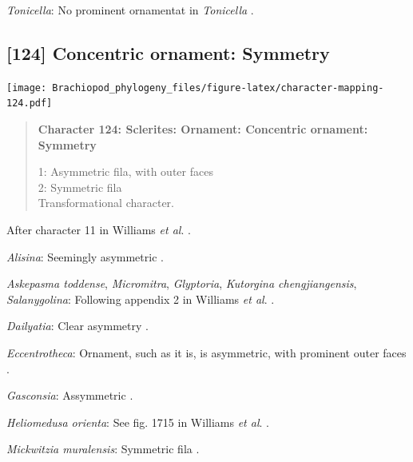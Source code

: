 \documentclass[openany]{book}
\begin{document}
\hypertarget{Tonicella-coding-123}{}
\emph{Tonicella}: No prominent ornamentat in \emph{Tonicella}
\citep{Connors2012}.

\subsection*{{[}124{]} Concentric ornament:
Symmetry}\label{concentric-ornament-symmetry}

\texttt{[image: Brachiopod\_phylogeny\_files/figure-latex/character-mapping-124.pdf]}

\begin{quote}
\textbf{Character 124: Sclerites: Ornament: Concentric ornament:
Symmetry}

1: Asymmetric fila, with outer faces\\
2: Symmetric fila\\
Transformational character.
\end{quote}

After character 11 in Williams \emph{et al}.
\citeyearpar{Williams1998Thediversity}.

\hypertarget{Alisina-coding-124}{}
\emph{Alisina}: Seemingly asymmetric \citetext{\citealp[fig.
122.3c]{Williams2000LinguliformeaCraniiformea}; \citealp[Fig.
1]{Zhang2011Anobolellate}}.

\hypertarget{Askepasma_toddense-coding-124}{}
\emph{Askepasma toddense}, \emph{Micromitra}, \emph{Glyptoria},
\emph{Kutorgina chengjiangensis}, \emph{Salanygolina}: Following
appendix 2 in Williams \emph{et al}.
\citeyearpar{Williams1998Thediversity}.

\hypertarget{Dailyatia-coding-124}{}
\emph{Dailyatia}: Clear asymmetry \citep{Skovsted2015Theearly}.

\hypertarget{Eccentrotheca-coding-124}{}
\emph{Eccentrotheca}: Ornament, such as it is, is asymmetric, with
prominent outer faces \citep{Skovsted2011Scleritomeconstruction}.

\hypertarget{Gasconsia-coding-124}{}
\emph{Gasconsia}: Assymmetric \citep[fig. 3]{Hanken1985Thetaxonomy}.

\hypertarget{Heliomedusa_orienta-coding-124}{}
\emph{Heliomedusa orienta}: See fig. 1715 in Williams \emph{et al}.
\citeyearpar{Williams2007Supplement}.

\hypertarget{Mickwitzia_muralensis-coding-124}{}
\emph{Mickwitzia muralensis}: Symmetric fila
\citep{Balthasar2004Shellstructure}.
\end{document}
